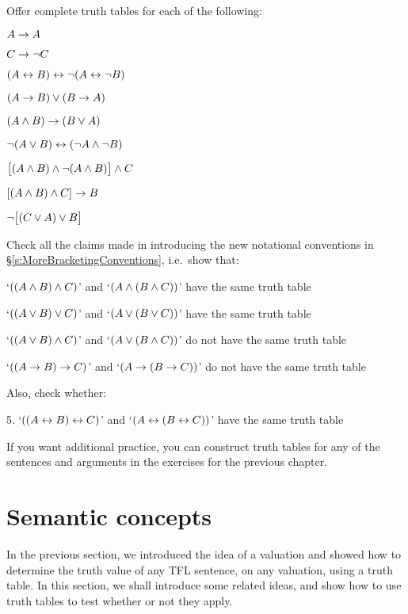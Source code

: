 \practiceproblems
\problempart
Offer complete truth tables for each of the following:
\begin{earg}
\item $A \rightarrow A$ %
\item $C \rightarrow\neg C$ %
\item $(A \leftrightarrow B) \leftrightarrow \neg(A\leftrightarrow \neg B)$ %
\item $(A \rightarrow B) \vee (B \rightarrow A)$ %
\item $(A \wedge B) \rightarrow (B \vee A)$  %
\item $\neg(A \vee B) \leftrightarrow (\neg A \wedge \neg B)$ %
\item $\bigl[(A\wedge B) \wedge\neg(A\wedge B)\bigr] \wedge C$ %
\item $[(A \wedge B) \wedge C] \rightarrow B$ %
\item $\neg\bigl[(C\vee A) \vee B\bigr]$ %
\end{earg}
\problempart
Check all the claims made in introducing the new notational conventions in \S\ref{s:MoreBracketingConventions}, i.e.\ show that:
\begin{earg}
	\item `$((A \wedge B) \wedge C)$' and `$(A \wedge (B \wedge C))$' have the same truth table
	\item `$((A \vee B) \vee C)$' and `$(A \vee (B \vee C))$' have the same truth table
	\item `$((A \vee B) \wedge C)$' and `$(A \vee (B \wedge C))$' do not have the same truth table
	\item `$((A \rightarrow B) \rightarrow C)$' and `$(A \rightarrow (B \rightarrow C))$' do not have the same truth table
\end{earg}
Also, check whether:
\begin{earg}
	\item[5.] `$((A \leftrightarrow B) \leftrightarrow C)$' and `$(A \leftrightarrow (B \leftrightarrow C))$' have the same truth table
\end{earg}
If you want additional practice, you can construct truth tables for any of the sentences and arguments in the exercises for the previous chapter.


\chapter{Semantic concepts}
In the previous section, we introduced the idea of a valuation and showed how to determine the truth value of any TFL sentence, on any valuation, using a truth table. In this section, we shall introduce some related ideas, and show how to use truth tables to test whether or not they apply.


